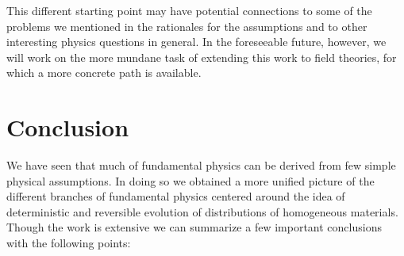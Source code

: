 \documentclass[smallextended]{svjour3}
\numberwithin{equation}{section}
\theoremstyle{definition}
\begin{document}
This different starting point may have potential connections to some of the problems we mentioned in the rationales for the assumptions and to other interesting physics questions in general. In the foreseeable future, however, we will work on the more mundane task of extending this work to field theories, for which a more concrete path is available.

\section{Conclusion}

We have seen that much of fundamental physics can be derived from few simple physical assumptions. In doing so we obtained a more unified picture of the different branches of fundamental physics centered around the idea of deterministic and reversible evolution of distributions of homogeneous materials. Though the work is extensive we can summarize a few important conclusions with the following points:
\end{document}
